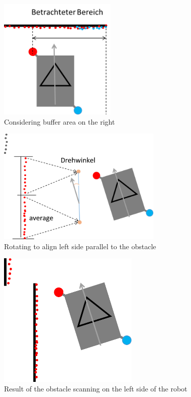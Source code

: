 \begin{figure}[ht]
\centering
\includegraphics[width=0.5\textwidth]{graphics/betrachteter_bereich.png}
\caption{Considering buffer area on the right}
\label{betrachteter_bereich}
\centering
\end{figure}

\begin{figure}[ht]
\centering
\includegraphics[width=0.7\textwidth]{graphics/rotate_left_parallel02.png}
\caption{Rotating to align left side parallel to the obstacle}
\label{rotate_left_parallel02}
\centering
\end{figure}

\begin{figure}[ht]
\centering
\includegraphics[width=0.6\textwidth]{graphics/rotate_left_parallel01.png}
\caption{Result of the obstacle scanning on the left side of the robot}
\label{rotate_left_parallel01}
\centering
\end{figure}

